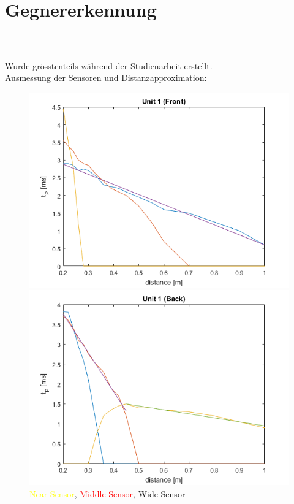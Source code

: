 \section{Gegnererkennung}
\begin{frame}
\frametitle{\,}
Wurde grösstenteils während der Studienarbeit erstellt.\\
Ausmessung der Sensoren und Distanzapproximation:
\begin{figure}
	\includegraphics[height = 4 cm]{../images/presentation/OD/FRONT_1.png}
	\hspace{2em}
	\includegraphics[height = 4 cm]{../images/presentation/OD/BACK_1.png}\\
	\textcolor{yellow}{Near-Sensor}, \textcolor{red}{Middle-Sensor}, \textcolor{cBlue}{Wide-Sensor}
\end{figure}

\end{frame}